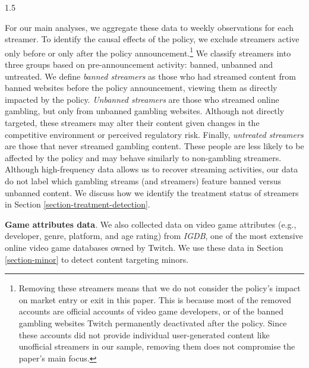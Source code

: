 \documentclass[a4paper,12pt]{article}
\begin{document}
\begin{spacing}{1.5}

For our main analyses, we aggregate these data to weekly observations for each streamer. To identify the causal effects of the policy, we exclude streamers active only before or only after the policy announcement.\footnote{Removing these streamers means that we do not consider the policy's impact on market entry or exit in this paper. This is because most of the removed accounts are official accounts of video game developers, or of the banned gambling websites Twitch permanently deactivated after the policy. Since these accounts did not provide individual user-generated content like unofficial streamers in our sample, removing them does not compromise the paper's main focus.} We classify streamers into three groups based on pre-announcement activity: banned, unbanned and untreated. We define \textit{banned streamers} as those who had streamed content from banned websites before the policy announcement, viewing them as directly impacted by the policy. \textit{Unbanned streamers} are those who streamed online gambling, but only from unbanned gambling websites. Although not directly targeted, these streamers may alter their content given changes in the competitive environment or perceived regulatory risk. Finally, \textit{untreated streamers} are those that never streamed gambling content. These people are less likely to be affected by the policy and may behave similarly to non-gambling streamers. Although high-frequency data allows us to recover streaming activities, our data do not label which gambling streams (and streamers) feature banned versus unbanned content. We discuss how we identify the treatment status of streamers in Section \ref{section-treatment-detection}. 

\noindent \textbf{Game attributes data}. We also collected data on video game attributes (e.g., developer, genre, platform, and age rating) from \textit{IGDB}, one of the most extensive online video game databases owned by Twitch. We use these data in Section \ref{section-minor} to detect content targeting minors. 


\end{spacing}
\end{document}
